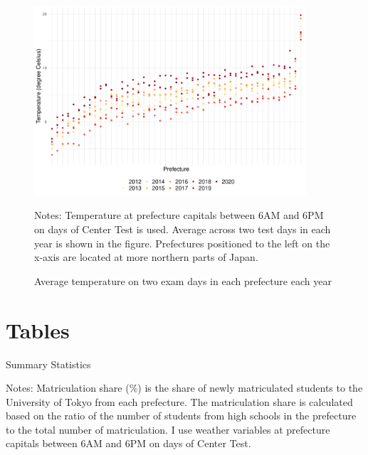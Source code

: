 \documentclass[12pt,letterpaper]{article}
\begin{document}
\begin{figure}[H]
  \centering
  \caption{Average temperature on two exam days in each prefecture each year}
  \includegraphics[width = 0.9\textwidth]{../Output/images/temperature_diff.pdf}
  \label{fig:temperature_diff}
  \footnotesize
  \begin{tablenotes}
    \item Notes:
      Temperature at prefecture capitals between 6AM and 6PM on days of Center Test is used.
      Average across two test days in each year is shown in the figure.
      Prefectures positioned to the left on the x-axis are located at more northern parts of Japan.
  \end{tablenotes}
\end{figure}

\section{Tables}

\begin{table}[H]
  \centering
  \caption{Summary Statistics}
  \resizebox{0.8\linewidth}{!}{
  
  }
  \label{tab:sum_stat}
  \footnotesize
  \begin{tablenotes}
    \item 
      Notes:
      Matriculation share (\%) is the share of newly matriculated students to the University of Tokyo from each prefecture.
      The matriculation share is calculated based on the ratio of the number of students from high schools in the prefecture to the total number of matriculation.
      I use weather variables at prefecture capitals between 6AM and 6PM on days of Center Test.
  \end{tablenotes}
\end{table}
\end{document}

